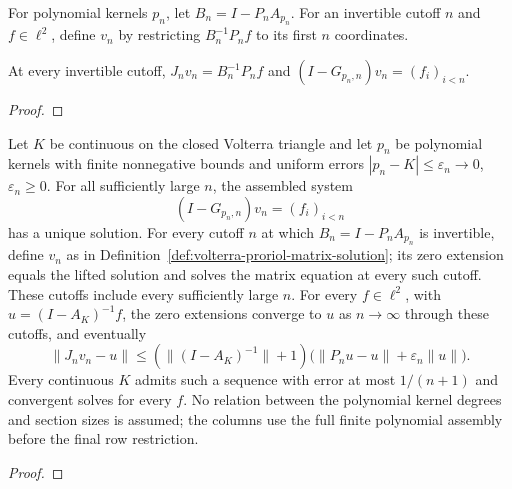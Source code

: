 \begin{supporting}
\begin{definition}
\label{def:volterra-proriol-matrix-solution}
\leanok
For polynomial kernels $p_n$, let $B_n=I-P_nA_{p_n}$. For an invertible
cutoff $n$ and $f\in\ell^2$, define $v_n$ by restricting $B_n^{-1}P_nf$
to its first $n$ coordinates.
\end{definition}

\begin{theorem}
\label{thm:volterra-proriol-matrix-solution}
\leanok
At every invertible cutoff, $J_nv_n=B_n^{-1}P_nf$ and
$(I-G_{p_n,n})v_n=(f_i)_{i<n}$.
\end{theorem}
\begin{proof}
\leanok
\end{proof}
\end{supporting}


\begin{theorem}
\label{thm:volterra-proriol-matrix-solves}
\leanok
Let $K$ be continuous on the closed Volterra triangle and let $p_n$ be
polynomial kernels with finite nonnegative bounds and uniform errors
$|p_n-K|\le\varepsilon_n\to0$, $\varepsilon_n\ge0$.
For all sufficiently large $n$, the assembled system
\[
 (I-G_{p_n,n})v_n=(f_i)_{i<n}
\]
has a unique solution. For every cutoff $n$ at which $B_n=I-P_nA_{p_n}$ is invertible, define $v_n$ as in Definition~\ref{def:volterra-proriol-matrix-solution}; its zero extension equals the lifted solution and solves the matrix
equation at every such cutoff. These cutoffs include every sufficiently large $n$. For every $f\in\ell^2$, with $u=(I-A_K)^{-1}f$, the zero extensions converge to $u$ as $n\to\infty$ through these cutoffs, and eventually
\[
 \|J_nv_n-u\|\le (\|(I-A_K)^{-1}\|+1)
       \bigl(\|P_nu-u\|+\varepsilon_n\|u\|\bigr).
\]
Every continuous $K$ admits such a sequence with error at most $1/(n+1)$
and convergent solves for every $f$. No relation between the polynomial
kernel degrees and section sizes is assumed; the columns use the full
finite polynomial assembly before the final row restriction.
\end{theorem}
\begin{proof}
\leanok
\end{proof}

